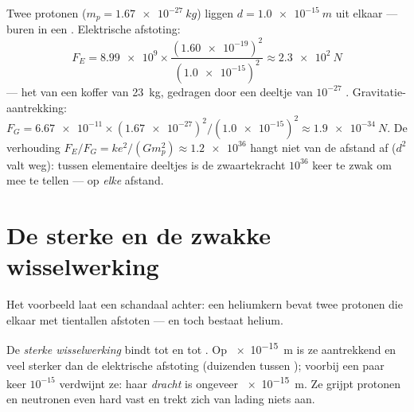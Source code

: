 \begin{example}\label{ex:g11:fundamental-interactions:protons}
Twee protonen ($m_p = \qty{1.67e-27}{kg}$) liggen $d = \qty{1.0e-15}{m}$
uit elkaar --- buren in een . Elektrische afstoting:
\[
F_E = \num{8.99e9} \times
\frac{(\num{1.60e-19})^{2}}{(\num{1.0e-15})^{2}}
\approx \qty{2.3e2}{N}
\]
--- het  van een koffer van \qty{23}{kg},
gedragen door een deeltje van $10^{-27}$
. Gravitatie-aantrekking:
$F_G = \num{6.67e-11} \times (\num{1.67e-27})^{2} /
(\num{1.0e-15})^{2} \approx \qty{1.9e-34}{N}$. De verhouding
$F_E / F_G = k e^{2} / (G m_p^{2}) \approx \num{1.2e36}$ hangt niet van
de afstand af ($d^{2}$ valt weg): tussen elementaire deeltjes is de
zwaartekracht $10^{36}$ keer te zwak om mee te tellen --- op \emph{elke}
afstand.
\end{example}

\section{De sterke en de zwakke wisselwerking}

Het voorbeeld laat een schandaal achter: een heliumkern bevat twee
protonen die elkaar met tientallen  afstoten --- en toch bestaat
helium.

\begin{definition}\label{def:g11:fundamental-interactions:strong}
De \emph{sterke wisselwerking} bindt 
tot  en  tot . Op \qty{e-15}{m} is ze aantrekkend
en veel sterker dan de elektrische afstoting (duizenden  tussen
); voorbij een paar keer $10^{-15}$  verdwijnt ze: haar
\emph{dracht} is ongeveer \qty{e-15}{m}. Ze grijpt protonen
en neutronen even hard vast en trekt zich van lading niets aan.
\end{definition}

